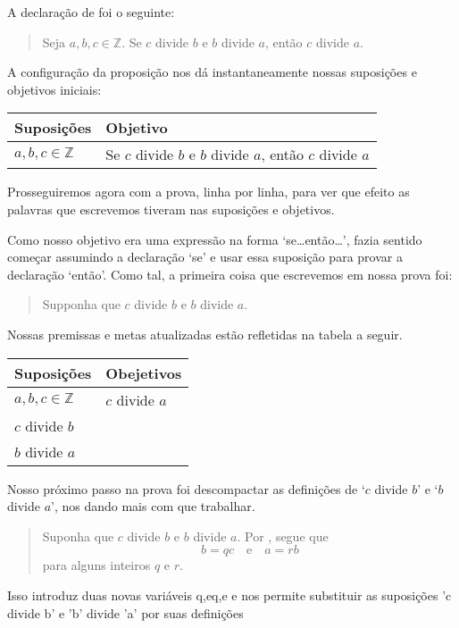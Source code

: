 \begin{example}
\label{exAssumptionsGoals}
A declaração de  foi o seguinte:
\begin{quote}
Seja $a,b,c \in \mathbb{Z}$. Se $c$ divide $b$ e $b$ divide $a$, então $c$ divide $a$.
\end{quote}
A configuração da proposição nos dá instantaneamente nossas suposições e objetivos iniciais:
\begin{center}
\begin{tabular}{C{150pt}|C{150pt}}
\textbf{Suposições} & \textbf{Objetivo} \\ \hline
$a,b,c \in \mathbb{Z}$ & Se $c$ divide $b$ e $b$ divide $a$, então $c$ divide $a$
\end{tabular}
\end{center}
Prosseguiremos agora com a prova, linha por linha, para ver que efeito as palavras que escrevemos tiveram nas suposições e objetivos.

Como nosso objetivo era uma expressão na forma `se\dots{}então\dots{}', fazia sentido começar assumindo a declaração `se' e usar essa suposição para provar a declaração `então'. Como tal, a primeira coisa que escrevemos em nossa prova foi:
\begin{quote}
Supponha que $c$ divide $b$ e $b$ divide $a$.
\end{quote}
Nossas premissas e metas atualizadas estão refletidas na tabela a seguir.
\begin{center}
\begin{tabular}{C{150pt}|C{150pt}}
\textbf{Suposições} & \textbf{Obejetivos} \\ \hline
$a,b,c \in \mathbb{Z}$ & $c$ divide $a$ \\
$c$ divide $b$ & \\
$b$ divide $a$ & 
\end{tabular}
\end{center}

Nosso próximo passo na prova foi descompactar as definições de `$c$ divide $b$' e `$b$ divide $a$', nos dando mais com que trabalhar.

\begin{quote}
{\color{gray} Suponha que $c$ divide $b$ e $b$ divide $a$.} Por , segue que
\[
b=qc \quad \text{e} \quad a=rb
\]
para alguns inteiros $q$ e $r$.
\end{quote}

Isso introduz duas novas variáveis q,eq,e e nos permite substituir as suposições 'c divide b' e 'b'  divide 'a' por suas definições


\end{example}
